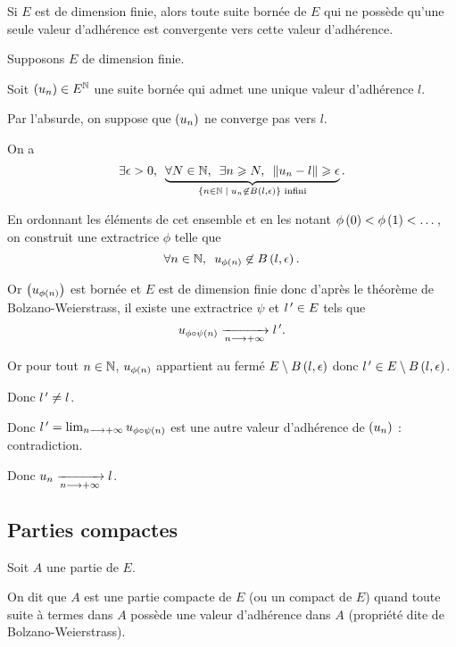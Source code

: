\begin{prop}
Si \(E\) est de dimension finie, alors toute suite bornée de \(E\) qui ne possède qu'une seule valeur d'adhérence est convergente vers cette valeur d'adhérence.
\end{prop}

\begin{dem}
Supposons \(E\) de dimension finie.

Soit \(\left(u_n\right)\in E^{\mathbb{N}}\) une suite bornée qui admet une unique valeur d'adhérence \(l\).

Par l'absurde, on suppose que \(\left(u_n\right)\) ne converge pas vers \(l\).

On a \[\quantifs{\exists\epsilon>0}\underbrace{\quantifs{\forall N\in\N;\exists n\geq N}\norme{u_n-l}\geq\epsilon}_{\accol{n\in\N\tq u_n\not\in\bouleo{l}{\epsilon}}\text{ infini}}.\]

En ordonnant les éléments de cet ensemble et en les notant \(\phi\left(0\right)<\phi\left(1\right)<\dots\), on construit une extractrice \(\phi\) telle que \[\quantifs{\forall n\in\N}u_{\phi\paren{n}}\not\in\bouleo{l}{\epsilon}.\]

Or \(\left(u_{\phi\left(n\right)}\right)\) est bornée et \(E\) est de dimension finie donc d'après le théorème de Bolzano-Weierstrass, il existe une extractrice \(\psi\) et \(l^{\,\prime}\in E\) tels que \[u_{\phi\circ\psi\left(n\right)}\xrightarrow[n\longrightarrow+\infty]{}l^{\,\prime}.\]

Or pour tout \(n\in\mathbb{N}\), \(u_{\phi\left(n\right)}\) appartient au fermé \(E\excluant\bouleo{l}{\epsilon}\) donc \(l\prim\in E\excluant\bouleo{l}{\epsilon}\).

Donc \(l^{\,\prime}\not=l\).

Donc \(l^{\,\prime}=\lim_{n\longrightarrow+\infty}u_{\phi\circ\psi\left(n\right)}\) est une autre valeur d'adhérence de \(\left(u_n\right)\) : contradiction.

Donc \(u_n\xrightarrow[n\longrightarrow+\infty]{}l\).
\end{dem}

\subsection{Parties compactes}

\begin{defi}
Soit \(A\) une partie de \(E\).

On dit que \(A\) est une partie compacte de \(E\) (ou un compact de \(E\)) quand toute suite à termes dans \(A\) possède une valeur d'adhérence dans \(A\) (propriété dite de Bolzano-Weierstrass).
\end{defi}

